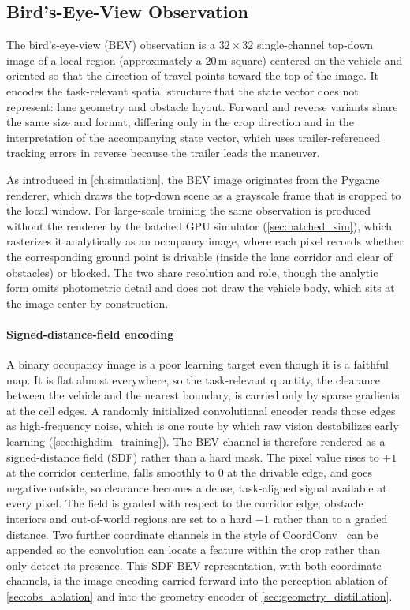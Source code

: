\subsection{Bird's-Eye-View Observation}

The bird's-eye-view (BEV) observation is a $32 \times 32$ single-channel top-down image of a local region (approximately a $20$\,m square) centered on the vehicle and oriented so that the direction of travel points toward the top of the image. It encodes the task-relevant spatial structure that the state vector does not represent: lane geometry and obstacle layout. Forward and reverse variants share the same size and format, differing only in the crop direction and in the interpretation of the accompanying state vector, which uses trailer-referenced tracking errors in reverse because the trailer leads the maneuver.

As introduced in \cref{ch:simulation}, the BEV image originates from the Pygame renderer, which draws the top-down scene as a grayscale frame that is cropped to the local window. For large-scale training the same observation is produced without the renderer by the batched GPU simulator (\cref{sec:batched_sim}), which rasterizes it analytically as an occupancy image, where each pixel records whether the corresponding ground point is drivable (inside the lane corridor and clear of obstacles) or blocked. The two share resolution and role, though the analytic form omits photometric detail and does not draw the vehicle body, which sits at the image center by construction.

\paragraph{Signed-distance-field encoding}
A binary occupancy image is a poor learning target even though it is a faithful map. It is flat almost everywhere, so the task-relevant quantity, the clearance between the vehicle and the nearest boundary, is carried only by sparse gradients at the cell edges. A randomly initialized convolutional encoder reads those edges as high-frequency noise, which is one route by which raw vision destabilizes early learning (\cref{sec:highdim_training}). The BEV channel is therefore rendered as a signed-distance field (SDF) rather than a hard mask. The pixel value rises to $+1$ at the corridor centerline, falls smoothly to $0$ at the drivable edge, and goes negative outside, so clearance becomes a dense, task-aligned signal available at every pixel. The field is graded with respect to the corridor edge; obstacle interiors and out-of-world regions are set to a hard $-1$ rather than to a graded distance. Two further coordinate channels in the style of CoordConv~\cite{liu2018coordconv} can be appended so the convolution can locate a feature within the crop rather than only detect its presence. This SDF-BEV representation, with both coordinate channels, is the image encoding carried forward into the perception ablation of \cref{sec:obs_ablation} and into the geometry encoder of \cref{sec:geometry_distillation}.

